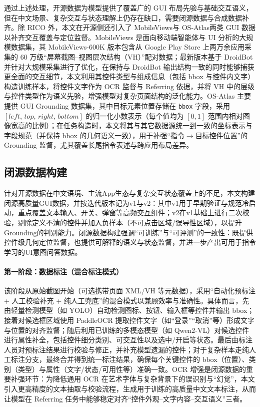 通过上述处理，开源数据为模型提供了覆盖广的 GUI 布局先验与基础交互语义，但在中文场景、复杂交互与状态理解上仍存在缺口，需要闭源数据与合成数据补齐。除 RICO 外，本文在开源侧还引入了 MobileViews\citep{gao2024mobileviews}与 OS-Atlas\citep{wu2024osatlas}两类 GUI 数据以补齐交互覆盖与定位监督。MobileViews 是面向移动端智能体与 UI 分析的大规模数据集，其 MobileViews-600K 版本包含从 Google Play Store 上两万余应用采集的 60 万级“屏幕截图--视图层次结构（VH）”配对数据；最新版本基于 DroidBot 并针对大规模采集进行了优化\citep{droidbot}，在保持与 DroidBot 输出结构一致的同时能够捕获更全面的交互细节，本文利用其控件类型与组成信息（包括 bbox 与控件内文字）构造训练样本，将控件文字作为 OCR 监督与 Referring 依据，并将 VH 中的层级与控件类型作为语义先验，增强模型对复杂页面结构的泛化能力。OS-Atlas 主要提供 GUI Grounding 数据集\citep{wu2024osatlas}，其中目标元素位置存储在 \texttt{bbox} 字段，采用 $[left,\,top,\,right,\,bottom]$ 的归一化小数表示（每个值均为 $[0,1]$ 范围内相对图像宽高的比例）；在任务构造时，本文将其与其它数据源统一到一致的坐标表示与字段规范（并保持 bbox 的几何语义一致），用于补强“指令$\rightarrow$目标控件位置”的 Grounding 监督，尤其覆盖长尾指令表述与跨应用布局差异。

\subsection{闭源数据构建}
针对开源数据在中文语境、主流App生态与复杂交互状态覆盖上的不足，本文构建闭源高质量GUI数据，并按迭代版本记为v1与v2：其中v1用于早期验证与规范冷启动，重点覆盖文本输入、开关、弹窗等高频交互组件；v2在v1基础上进行二次校验，剔除定义不清的控件并加入负样本（不可点击区域/误导性区域），以提升Grounding的判别能力。闭源数据构建强调“可训练”与“可评测”的一致性：既提供控件级几何定位监督，也提供可解释的语义与状态监督，并进一步产出可用于指令学习的UI意图问答数据。

\paragraph{第一阶段：数据标注（混合标注模式）}
该阶段从原始截图开始（可选携带页面 XML/VH 等元数据），采用“自动化预标注 + 人工校验补充 + 纯人工兜底”的混合模式以兼顾效率与准确性。具体而言，先由轻量检测模型（如 YOLO\citep{redmon2016yolo}）自动检测图标、按钮、输入框等控件并输出 bbox；接着对候选框区域使用 PaddleOCR 提取控件文字（如“登录”“取消”等）形成文字与位置的对齐监督\citep{du2020ppocr}；随后利用已训练的多模态模型（如 Qwen2-VL）对候选控件进行属性补全，包括控件细分类别、可交互性以及选中/开启等状态\citep{bai2025qwen25vl}。最后由标注人员对预标注结果进行校验与修正，并补充模型遗漏的控件；对于复杂样本走纯人工标注分支，最终合并得到统一标注结果，确保每个关键控件的 bbox（位置）、类别（类型）与属性（文字/状态/可用性等）准确一致。OCR 增强是闭源数据的重要补强环节：为降低通用 OCR 在艺术字体与复杂背景下的误识别与“幻觉”，本文引入更高精度的文本抽取与校验流程，生成用于训练的高质量中文文本标注，从而让模型在 Referring 任务中能够稳定对齐“控件外观--文字内容--交互语义”三者。

